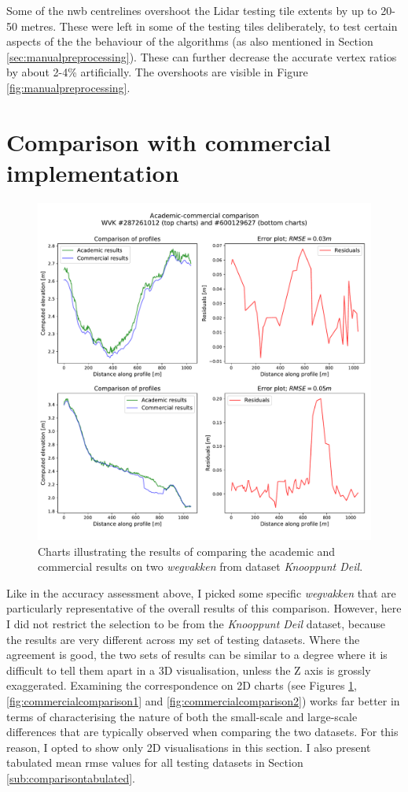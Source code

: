 Some of the \ac{nwb} centrelines overshoot the Lidar testing tile extents by up to 20-50 metres. These were left in some of the testing tiles deliberately, to test certain aspects of the the behaviour of the algorithms (as also mentioned in Section \ref{sec:manualpreprocessing}). These can further decrease the accurate vertex ratios by about 2-4\% artificially. The overshoots are visible in Figure \ref{fig:manualpreprocessing}.

\section{Comparison with commercial implementation}
\label{sec:r_comparison}

\begin{figure}
    \centering
    \includegraphics[width=0.9\linewidth]{final_report/figs/commercialcomparison0.pdf}
    \caption{Charts illustrating the results of comparing the academic and commercial results on two \textit{wegvakken} from dataset \textit{Knooppunt Deil}.}
    \label{fig:commercialcomparison0}
\end{figure}

Like in the accuracy assessment above, I picked some specific \textit{wegvakken} that are particularly representative of the overall results of this comparison. However, here I did not restrict the selection to be from the \textit{Knooppunt Deil} dataset, because the results are very different across my set of testing datasets. Where the agreement is good, the two sets of results can be similar to a degree where it is difficult to tell them apart in a 3D visualisation, unless the Z axis is grossly exaggerated. Examining the correspondence on 2D charts (see Figures \ref{fig:commercialcomparison0}, \ref{fig:commercialcomparison1} and \ref{fig:commercialcomparison2}) works far better in terms of characterising the nature of both the small-scale and large-scale differences that are typically observed when comparing the two datasets. For this reason, I opted to show only 2D visualisations in this section. I also present tabulated mean \ac{rmse} values for all testing datasets in Section \ref{sub:comparisontabulated}.

